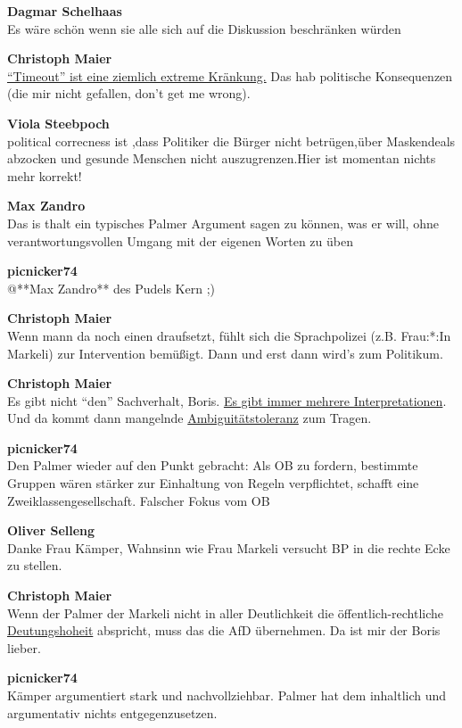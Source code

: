 \documentclass[]{article}
\begin{document}
\textbf{Dagmar Schelhaas}\\
Es wäre schön wenn sie alle sich auf die Diskussion beschränken würden

\textbf{Christoph Maier}\\
\protect\hyperlink{timeout}{``Timeout'' ist eine ziemlich extreme
Kränkung.} Das hab politische Konsequenzen (die mir nicht gefallen,
don't get me wrong).

\textbf{Viola Steebpoch}\\
political correcness ist ,dass Politiker die Bürger nicht betrügen,über
Maskendeals abzocken und gesunde Menschen nicht auszugrenzen.Hier ist
momentan nichts mehr korrekt!

\textbf{Max Zandro}\\
Das is thalt ein typisches Palmer Argument sagen zu können, was er
will, ohne verantwortungsvollen Umgang mit der eigenen Worten zu üben

\textbf{picnicker74}\\
@**Max Zandro** des Pudels Kern ;)

\textbf{Christoph Maier}\\
Wenn mann da noch einen draufsetzt, fühlt sich die Sprachpolizei (z.B.
Frau:*:In Markeli) zur Intervention bemüßigt. Dann und erst dann wird's
zum Politikum.

\textbf{Christoph Maier}\\
Es gibt nicht ``den'' Sachverhalt, Boris.
\protect\hyperlink{Calliope-Collapse}{Es gibt immer mehrere
Interpretationen}. Und da kommt dann mangelnde
\protect\hyperlink{Ambiguitaetstoleranz}{Ambiguitätstoleranz} zum
Tragen.

\textbf{picnicker74}\\
Den Palmer wieder auf den Punkt gebracht: Als OB zu fordern, bestimmte
Gruppen wären stärker zur Einhaltung von Regeln verpflichtet, schafft
eine Zweiklassengesellschaft. Falscher Fokus vom OB

\textbf{Oliver Selleng}\\
Danke Frau Kämper, Wahnsinn wie Frau Markeli versucht BP in die rechte
Ecke zu stellen.

\textbf{Christoph Maier}\\
Wenn der Palmer der Markeli nicht in aller Deutlichkeit die
öffentlich-rechtliche \protect\hyperlink{Deutungshoheit}{Deutungshoheit}
abspricht, muss das die AfD übernehmen. Da ist mir der Boris lieber.

\textbf{picnicker74}\\
Kämper argumentiert stark und nachvollziehbar. Palmer hat dem
inhaltlich und argumentativ nichts entgegenzusetzen.
\end{document}
